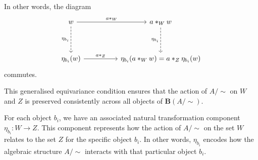 In other words, the diagram
\begin{equation}
\begin{tikzcd}[ampersand replacement=\&]
    w \&\& {a *_{W} w} \\
    \\
    {\eta_{b_{i}}(w)} \&\& {\eta_{b_{i}}(a *_{W} w) = a *_{Z} \eta_{b_{i}}(w)}
    \arrow["{{a *_{W}}}", from=1-1, to=1-3]
    \arrow["{{\eta_{b_{i}}}}"', dashed, from=1-1, to=3-1]
    \arrow["{{\eta_{b_{i}}}}"', dashed, from=1-3, to=3-3]
    \arrow["{{a *_{Z}}}", from=3-1, to=3-3]
\end{tikzcd}
\end{equation}
 commutes.

This generalised equivariance condition ensures that the action of $A/\sim$ on $W$ and $Z$ is preserved consistently across all objects of $\textbf{B}(A/\sim)$.

\begin{remark}
    For each object $b_i$, we have an associated natural transformation component $\eta_{b_i}: W \to Z$.
    This component represents how the action of $A/\sim$ on the set $W$ relates to the set $Z$ for the specific object $b_i$.
    In other words, $\eta_{b_i}$ encodes how the algebraic structure $A/\sim$ interacts with that particular object $b_i$.
\end{remark}

